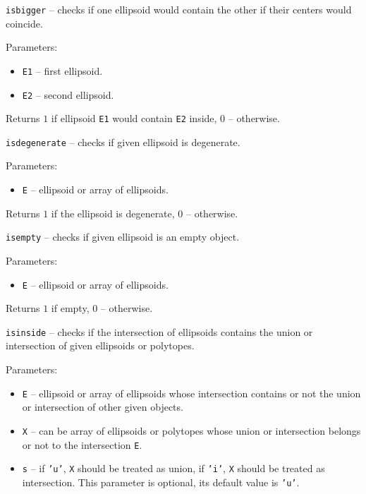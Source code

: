 \newpage

{\Large {\tt isbigger}} -- checks if one ellipsoid would contain the other if their
centers would coincide.

Parameters:
\begin{itemize}
\item {\tt E1} -- first ellipsoid.
\item {\tt E2} -- second ellipsoid.
\end{itemize}

Returns $1$ if ellipsoid {\tt E1}
would contain {\tt E2} inside, 0 -- otherwise.

\newpage

{\Large {\tt isdegenerate}} -- checks if given ellipsoid is degenerate.

Parameters:
\begin{itemize}
\item {\tt E} -- ellipsoid or array of ellipsoids.
\end{itemize}

Returns $1$ if the ellipsoid is degenerate, $0$ -- otherwise.

\newpage

{\Large {\tt isempty}} -- checks if given ellipsoid is an empty object.

Parameters:
\begin{itemize}
\item {\tt E} -- ellipsoid or array of ellipsoids.
\end{itemize}

Returns $1$ if empty, $0$ -- otherwise.

\newpage

{\Large {\tt isinside}} -- checks if the intersection of ellipsoids contains
the union or intersection of given ellipsoids or polytopes.

Parameters:
\begin{itemize}
\item {\tt E} -- ellipsoid or array of ellipsoids whose intersection contains
or not the union or intersection of other given objects.
\item {\tt X} -- can be array of ellipsoids or polytopes whose union or
intersection belongs or not to the intersection {\tt E}.
\item {\tt s} -- if {\tt 'u'}, {\tt X} should be treated as union,
if {\tt 'i'}, {\tt X} should be treated as intersection. This parameter
is optional, its default value is {\tt 'u'}.
\end{itemize}

